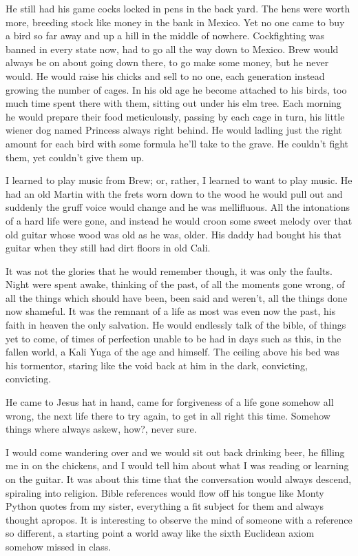 \documentclass[ebook, 10pt, openright, onecolumn]{memoir}
\begin{document}
He still had his game cocks locked in pens in the back yard.  The hens
were worth more, breeding stock like money in the bank in Mexico.  Yet no one
came to buy a bird so far away and up a hill in the middle of
nowhere. Cockfighting was banned in every state now, had to go all the way down
to Mexico.  Brew would always be on about going down there, to go make some
money, but he never would.  He would raise his chicks and sell to no one, each
generation instead growing the number of cages.  In his old age he become
attached to his birds, too much time spent there with them, sitting out under
his elm tree.  Each morning he would prepare their food meticulously, passing by
each cage in turn, his little wiener dog named Princess always right behind. He
would ladling just the right amount for each bird with some formula he'll take
to the grave.  He couldn't fight them, yet couldn't give them up.

I learned to play music from Brew; or, rather, I learned to want to play music.
He had an old Martin with the frets worn down to the wood he would pull out and
suddenly the gruff voice would change and he was mellifluous.  All the
intonations of a hard life were gone, and instead he would croon some sweet
melody over that old guitar whose wood was old as he was, older.  His daddy had
bought his that guitar when they still had dirt floors in old Cali.

It was not the glories that he would remember though, it was only the faults.
Night were spent awake, thinking of the past, of all the moments gone wrong, of
all the things which should have been, been said and weren't, all the things
done now shameful.  It was the remnant of a life as most was even now the past,
his faith in heaven the only salvation.  He would endlessly talk of the bible,
of things yet to come, of times of perfection unable to be had in days such as
this, in the fallen world, a Kali Yuga of the age and himself.  The ceiling
above his bed was his tormentor, staring like the void back at him in the dark,
convicting, convicting.

He came to Jesus hat in hand, came for forgiveness of a life gone somehow all
wrong, the next life there to try again, to get in all right this time.  Somehow
things where always askew, how?, never sure.

I would come wandering over and we would sit out back drinking beer, he filling
me in on the chickens, and I would tell him about what I was reading or learning
on the guitar.  It was about this time that the conversation would always
descend, spiraling into religion.  Bible references would flow off his tongue
like Monty Python quotes from my sister, everything a fit subject for them and
always thought apropos.  It is interesting to observe the mind of someone with a
reference so different, a starting point a world away like the sixth Euclidean
axiom somehow missed in class.
\end{document}
